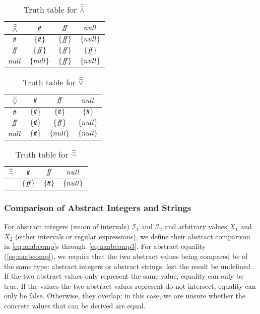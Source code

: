 \begin{table}[H]
    \centering
    \caption{Truth table for $\widetilde{\widetilde{\land}}$}
    \begin{tabular}{c|ccc}
        $\widetilde{\widetilde{\land}}$ & $t\!t$ & $f\!\!f$ & $null$ \\
        \hline
        $t\!t$ & $\{t\!t\}$ & $\{f\!\!f\}$ & $\{null\}$ \\
        $f\!\!f$ & $\{f\!\!f\}$ & $\{f\!\!f\}$ & $\{f\!\!f\}$ \\
        $null$ & $\{null\}$ & $\{f\!\!f\}$ & $\{null\}$ \\
    \end{tabular}
    \label{tab:aaabland}
\end{table}

\begin{table}[H]
    \centering
    \caption{Truth table for $\widetilde{\widetilde{\lor}}$}
    \begin{tabular}{c|ccc}
        $\widetilde{\widetilde{\lor}}$ & $t\!t$ & $f\!\!f$ & $null$ \\
        \hline
        $t\!t$ & $\{t\!t\}$ & $\{t\!t\}$ & $\{t\!t\}$ \\
        $f\!\!f$ & $\{t\!t\}$ & $\{f\!\!f\}$ & $\{null\}$ \\
        $null$ & $\{t\!t\}$ & $\{null\}$ & $\{null\}$ \\
    \end{tabular}
    \label{tab:aaablor}
\end{table}

\begin{table}[H]
    \centering
    \caption{Truth table for $\widetilde{\widetilde{\neg}}$}
    \begin{tabular}{c|ccc}
        $\widetilde{\widetilde{\neg}}$ & $t\!t$ & $f\!\!f$ & $null$ \\
        \hline
        & $\{f\!\!f\}$ & $\{t\!t\}$ & $\{null\}$ \\
    \end{tabular}
    \label{tab:aaabneg}
\end{table}

\subsubsection{Comparison of Abstract Integers and Strings}\label{subsubsec:abstract-comparison}
For abstract integers (union of intervals) $\mathscr{I}_1$ and $\mathscr{I}_2$ and arbitrary values $X_1$ and $X_2$ (either intervals or regular expressions), we define their abstract comparison in \autoref{eq:aaabcomp}s through~\ref{eq:aaabcomp3}.
For abstract equality (\autoref{eq:aaabcomp}), we require that the two abstract values being compared be of the same type: abstract integers or abstract strings, lest the result be undefined.
If the two abstract values only represent the same value, equality can only be true.
If the values the two abstract values represent do not intersect, equality can only be false.
Otherwise, they overlap; in this case, we are unsure whether the concrete values that can be derived are equal.

